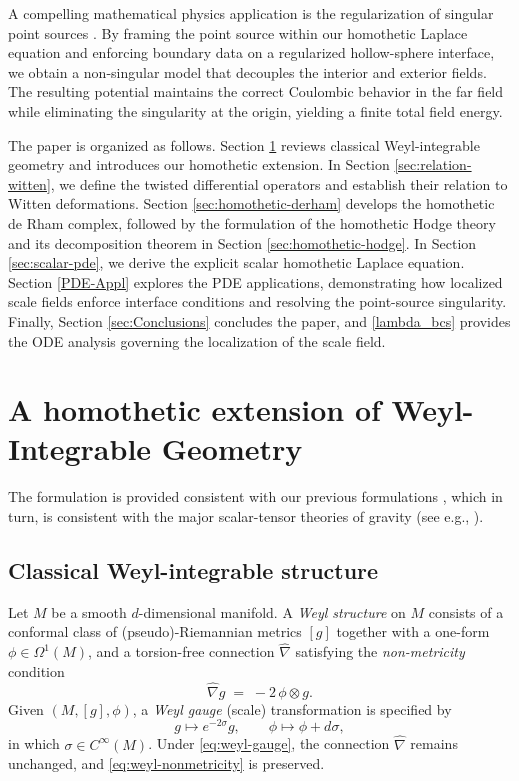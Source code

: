 \documentclass[preprint,12pt]{elsarticle}
\theoremstyle{plain}
\theoremstyle{definition}
\theoremstyle{note}
\begin{document}
A compelling mathematical physics application is the regularization of singular point sources \cite{BornInfeld1934, Jackson1998}. By framing the point source within our homothetic Laplace equation and enforcing boundary data on a regularized hollow-sphere interface, we obtain a non-singular model that decouples the interior and exterior fields. The resulting potential maintains the correct Coulombic behavior in the far field while eliminating the singularity at the origin, yielding a finite total field energy.

The paper is organized as follows. Section \ref{sec:setting} reviews classical Weyl-integrable geometry and introduces our homothetic extension. In Section \ref{sec:relation-witten}, we define the twisted differential operators and establish their relation to Witten deformations. Section \ref{sec:homothetic-derham} develops the homothetic de Rham complex, followed by the formulation of the homothetic Hodge theory and its decomposition theorem in Section \ref{sec:homothetic-hodge}. In Section \ref{sec:scalar-pde}, we derive the explicit scalar homothetic Laplace equation. Section \ref{PDE-Appl} explores the PDE applications, demonstrating how localized scale fields enforce interface conditions and resolving the point-source singularity. Finally, Section \ref{sec:Conclusions} concludes the paper, and \ref{lambda_bcs} provides the ODE analysis governing the localization of the scale field.

\section{A homothetic extension of Weyl-Integrable Geometry}
\label{sec:setting}
The formulation is provided consistent with our previous formulations \cite{Sabetghadam2025}, which in turn, is consistent with the major scalar-tensor theories of gravity (see e.g., \cite{RomeroFonsecaNetoPucheu2012}). 

\subsection{Classical Weyl-integrable structure}

Let $M$ be a smooth $d$-dimensional manifold. A \emph{Weyl structure} \cite{Weyl1918} on $M$ consists of a conformal class of (pseudo)-Riemannian metrics $[g]$ together with a one-form $\phi\in\Omega^{1}(M)$, and a torsion-free connection $\hat\nabla$ satisfying the \emph{non-metricity} condition
\begin{equation}\label{eq:weyl-nonmetricity}
\hat\nabla g \;=\; -2\,\phi\otimes g .
\end{equation}
Given $(M,[g],\phi)$, a \emph{Weyl gauge} (scale) transformation is specified by 
\begin{equation}\label{eq:weyl-gauge}
g \longmapsto e^{-2\sigma}g,
\qquad
\phi \longmapsto \phi + d\sigma,
\end{equation}
in which $\sigma\in C^\infty(M)$. Under \eqref{eq:weyl-gauge}, the connection $\hat\nabla$ remains unchanged, and \eqref{eq:weyl-nonmetricity} is preserved.
\end{document}

